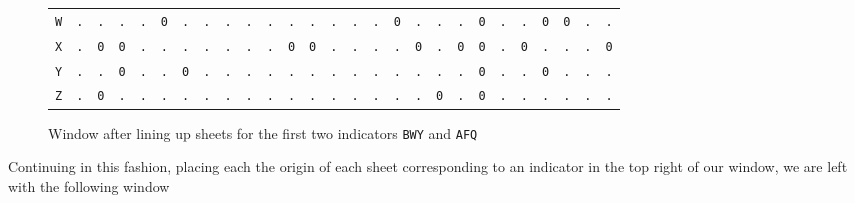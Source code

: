 \begin{figure}[H]
\begin{center}
{\begin{tabular}{c|cccccccccccccccccccccccccc}
				\texttt{W} & \texttt{.} & \texttt{.} & \texttt{.} &
				\texttt{.} & \texttt{0} & \texttt{.} & \texttt{.} &
				\texttt{.} & \texttt{.} & \texttt{.} & \texttt{.} &
				\texttt{.} & \texttt{.} & \texttt{.} & \texttt{.} &
				\texttt{0} & \texttt{.} & \texttt{.} & \texttt{.} &
				\texttt{0} & \texttt{.} & \texttt{.} & \texttt{0} &
				\texttt{0} & \texttt{.} & \texttt{.}                             \\
				\texttt{X} & \texttt{.} & \texttt{0} & \texttt{0} &
				\texttt{.} & \texttt{.} & \texttt{.} & \texttt{.} &
				\texttt{.} & \texttt{.} & \texttt{.} & \texttt{0} &
				\texttt{0} & \texttt{.} & \texttt{.} & \texttt{.} &
				\texttt{.} & \texttt{0} & \texttt{.} & \texttt{0} &
				\texttt{0} & \texttt{.} & \texttt{0} & \texttt{.} &
				\texttt{.} & \texttt{.} & \texttt{0}                             \\
				\texttt{Y} & \texttt{.} & \texttt{.} & \texttt{0} &
				\texttt{.} & \texttt{.} & \texttt{0} & \texttt{.} &
				\texttt{.} & \texttt{.} & \texttt{.} & \texttt{.} &
				\texttt{.} & \texttt{.} & \texttt{.} & \texttt{.} &
				\texttt{.} & \texttt{.} & \texttt{.} & \texttt{.} &
				\texttt{0} & \texttt{.} & \texttt{.} & \texttt{0} &
				\texttt{.} & \texttt{.} & \texttt{.}                             \\
				\texttt{Z} & \texttt{.} & \texttt{0} & \texttt{.} &
				\texttt{.} & \texttt{.} & \texttt{.} & \texttt{.} &
				\texttt{.} & \texttt{.} & \texttt{.} & \texttt{.} &
				\texttt{.} & \texttt{.} & \texttt{.} & \texttt{.} &
				\texttt{.} & \texttt{.} & \texttt{0} & \texttt{.} &
				\texttt{0} & \texttt{.} & \texttt{.} & \texttt{.} &
				\texttt{.} & \texttt{.} & \texttt{.}                             \\
			\end{tabular}
		}
	\end{center}
	\caption{Window after lining up sheets for the first two indicators
		\texttt{BWY} and \texttt{AFQ}}
\end{figure}
\noindent Continuing in this fashion, placing each the origin of each
sheet corresponding to an indicator in the top right of our window,
we are left with the following window

